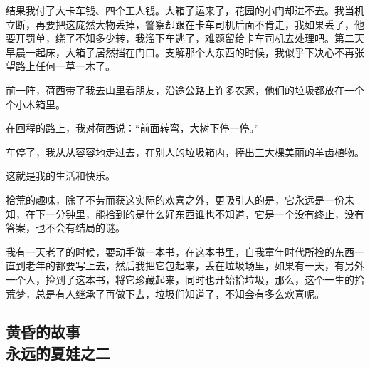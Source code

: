 \par 结果我付了大卡车钱、四个工人钱。大箱子运来了，花园的小门却进不去。我当机立断，再要把这庞然大物丢掉，警察却跟在卡车司机后面不肯走，我如果丢了，他要开罚单，绕了不知多少转，我溜下车逃了，难题留给卡车司机去处理吧。第二天早晨一起床，大箱子居然挡在门口。支解那个大东西的时候，我似乎下决心不再张望路上任何一草一木了。
\par 前一阵，荷西带了我去山里看朋友，沿途公路上许多农家，他们的垃圾都放在一个个小木箱里。
\par 在回程的路上，我对荷西说：“前面转弯，大树下停一停。”
\par 车停了，我从从容容地走过去，在别人的垃圾箱内，捧出三大棵美丽的羊齿植物。
\par 这就是我的生活和快乐。
\par 拾荒的趣味，除了不劳而获这实际的欢喜之外，更吸引人的是，它永远是一份未知，在下一分钟里，能拾到的是什么好东西谁也不知道，它是一个没有终止，没有答案，也不会有结局的谜。
\par 我有一天老了的时候，要动手做一本书，在这本书里，自我童年时代所捡的东西一直到老年的都要写上去，然后我把它包起来，丢在垃圾场里，如果有一天，有另外一个人，捡到了这本书，将它珍藏起来，同时也开始拾垃圾，那么，这个一生的拾荒梦，总是有人继承了再做下去，垃圾们知道了，不知会有多么欢喜呢。


\subsection{黄昏的故事\\\small{永远的夏娃之二}}

